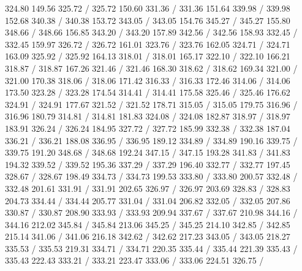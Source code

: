 { 324.80 149.56 325.72 /
 325.72 150.60 331.36 /
 331.36 151.64 339.98 /
 339.98 152.68 340.38 /
 340.38 153.72 343.05 /
 343.05 154.76 345.27 /
 345.27 155.80 348.66 /
 348.66 156.85 343.20 /
 343.20 157.89 342.56 /
 342.56 158.93 332.45 /
 332.45 159.97 326.72 /
 326.72 161.01 323.76 /
 323.76 162.05 324.71 /
 324.71 163.09 325.92 /
 325.92 164.13 318.01 /
 318.01 165.17 322.10 /
 322.10 166.21 318.87 /
 318.87 167.26 321.46 /
 321.46 168.30 318.62 /
 318.62 169.34 321.00 /
 321.00 170.38 318.06 /
 318.06 171.42 316.33 /
 316.33 172.46 314.06 /
 314.06 173.50 323.28 /
 323.28 174.54 314.41 /
 314.41 175.58 325.46 /
 325.46 176.62 324.91 /
 324.91 177.67 321.52 /
 321.52 178.71 315.05 /
 315.05 179.75 316.96 /
 316.96 180.79 314.81 /
 314.81 181.83 324.08 /
 324.08 182.87 318.97 /
 318.97 183.91 326.24 /
 326.24 184.95 327.72 /
 327.72 185.99 332.38 /
 332.38 187.04 336.21 /
 336.21 188.08 336.95 /
 336.95 189.12 334.89 /
 334.89 190.16 339.75 /
 339.75 191.20 348.68 /
 348.68 192.24 347.15 /
 347.15 193.28 341.83 /
 341.83 194.32 339.52 /
 339.52 195.36 337.29 /
 337.29 196.40 332.77 /
 332.77 197.45 328.67 /
 328.67 198.49 334.73 /
 334.73 199.53 333.80 /
 333.80 200.57 332.48 /
 332.48 201.61 331.91 /
 331.91 202.65 326.97 /
 326.97 203.69 328.83 /
 328.83 204.73 334.44 /
 334.44 205.77 331.04 /
 331.04 206.82 332.05 /
 332.05 207.86 330.87 /
 330.87 208.90 333.93 /
 333.93 209.94 337.67 /
 337.67 210.98 344.16 /
 344.16 212.02 345.84 /
 345.84 213.06 345.25 /
 345.25 214.10 342.85 /
 342.85 215.14 341.06 /
 341.06 216.18 342.62 /
 342.62 217.23 343.05 /
 343.05 218.27 335.53 /
 335.53 219.31 334.71 /
 334.71 220.35 335.44 /
 335.44 221.39 335.43 /
 335.43 222.43 333.21 /
 333.21 223.47 333.06 /
 333.06 224.51 326.75 /
}
